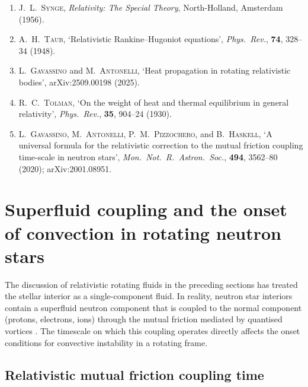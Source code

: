 \begin{enumerate}
\item J.~L.~\textsc{Synge}, \emph{Relativity: The Special Theory},
  North-Holland, Amsterdam (1956).

\item A.~H.~\textsc{Taub}, `Relativistic Rankine--Hugoniot equations',
  \emph{Phys.\ Rev.}, \textbf{74}, 328--34 (1948).

\item L.~\textsc{Gavassino} and M.~\textsc{Antonelli}, `Heat
  propagation in rotating relativistic bodies',
  arXiv:2509.00198 (2025).

\item R.~C.~\textsc{Tolman}, `On the weight of heat and thermal
  equilibrium in general relativity',
  \emph{Phys.\ Rev.}, \textbf{35}, 904--24 (1930).

\item L.~\textsc{Gavassino}, M.~\textsc{Antonelli},
  P.~M.~\textsc{Pizzochero}, and B.~\textsc{Haskell},
  `A universal formula for the relativistic correction to the mutual
  friction coupling time-scale in neutron stars',
  \emph{Mon.\ Not.\ R.\ Astron.\ Soc.}, \textbf{494},
  3562--80 (2020); arXiv:2001.08951.
\end{enumerate}

\section{Superfluid coupling and the onset of convection in
  rotating neutron stars}\label{sec:rel-3-superfluid}

The discussion of relativistic rotating fluids in the preceding sections
has treated the stellar interior as a single-component fluid.  In
reality, neutron star interiors contain a superfluid neutron component
that is coupled to the normal component (protons, electrons, ions)
through the mutual friction mediated by quantised vortices
\citep{GavassinoAntonelliPizzocheroHaskell2020}.  The timescale on
which this coupling operates directly affects the onset conditions for
convective instability in a rotating frame.

\subsection{Relativistic mutual friction coupling time}
\label{sec:rel-3-mutual-friction}

